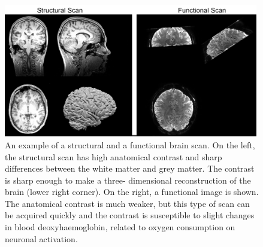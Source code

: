 \begin{figure}[!ht]
	\centering
	\includegraphics[width=0.99\textwidth, clip=true]{./Chapters/01_Introduction/Images/MyBrain}
	\caption{An example of a structural and a functional brain scan. On the left, the structural scan has high anatomical contrast and sharp differences between the white matter and grey matter. The contrast is sharp enough to make a three- dimensional reconstruction of the brain (lower right corner). On the right, a functional image is shown. The anatomical contrast is much weaker, but this type of scan can be acquired quickly and the contrast is susceptible to slight changes in blood deoxyhaemoglobin, related to oxygen consumption on neuronal activation.}
	\label{fig:mybrain}
\end{figure}
